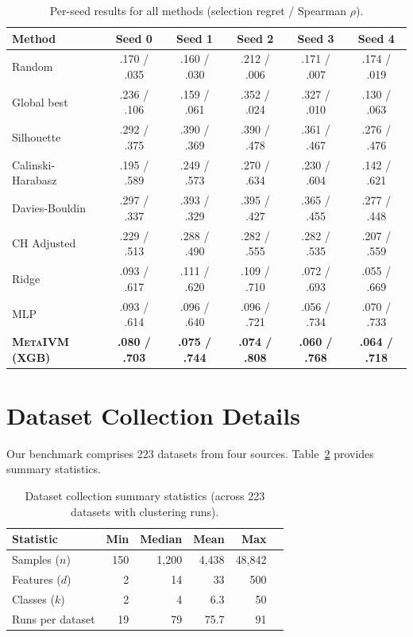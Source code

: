 \documentclass[10pt]{article} %
\newcommand{\ours}{\textsc{MetaIVM}}
\begin{document}
\begin{table}[h]
\centering
\caption{Per-seed results for all methods (selection regret / Spearman $\rho$).}
\label{tab:app_seeds}
\small
\begin{tabular}{lccccc}
\toprule
\textbf{Method} & \textbf{Seed 0} & \textbf{Seed 1} & \textbf{Seed 2} & \textbf{Seed 3} & \textbf{Seed 4} \\
\midrule
Random & .170 / .035 & .160 / .030 & .212 / .006 & .171 / .007 & .174 / .019 \\
Global best & .236 / .106 & .159 / .061 & .352 / .024 & .327 / .010 & .130 / .063 \\
Silhouette & .292 / .375 & .390 / .369 & .390 / .478 & .361 / .467 & .276 / .476 \\
Calinski-Harabasz & .195 / .589 & .249 / .573 & .270 / .634 & .230 / .604 & .142 / .621 \\
Davies-Bouldin & .297 / .337 & .393 / .329 & .395 / .427 & .365 / .455 & .277 / .448 \\
CH Adjusted & .229 / .513 & .288 / .490 & .282 / .555 & .282 / .535 & .207 / .559 \\
\midrule
Ridge & .093 / .617 & .111 / .620 & .109 / .710 & .072 / .693 & .055 / .669 \\
MLP & .093 / .614 & .096 / .640 & .096 / .721 & .056 / .734 & .070 / .733 \\
\textbf{\ours{} (XGB)} & \textbf{.080 / .703} & \textbf{.075 / .744} & \textbf{.074 / .808} & \textbf{.060 / .768} & \textbf{.064 / .718} \\
\bottomrule
\end{tabular}
\end{table}


\section{Dataset Collection Details}
\label{app:datasets}

Our benchmark comprises 223 datasets from four sources. Table~\ref{tab:app_stats} provides summary statistics.

\begin{table}[h]
\centering
\caption{Dataset collection summary statistics (across 223 datasets with clustering runs).}
\label{tab:app_stats}
\small
\begin{tabular}{lrrrrr}
\toprule
\textbf{Statistic} & \textbf{Min} & \textbf{Median} & \textbf{Mean} & \textbf{Max} \\
\midrule
Samples ($n$) & 150 & 1,200 & 4,438 & 48,842 \\
Features ($d$) & 2 & 14 & 33 & 500 \\
Classes ($k$) & 2 & 4 & 6.3 & 50 \\
Runs per dataset & 19 & 79 & 75.7 & 91 \\
\bottomrule
\end{tabular}
\end{table}
\end{document}
